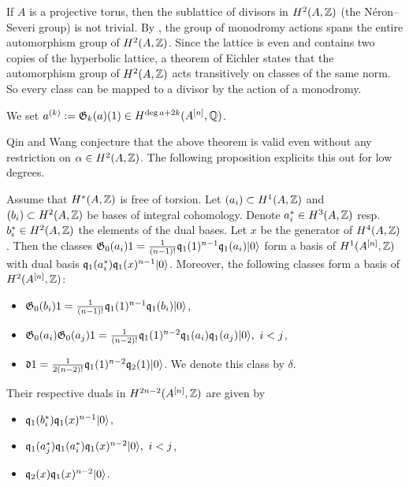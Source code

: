 \begin{remark}
If $A$ is a projective torus, then the sublattice of divisors in $H^2(A,\mathbb{Z})$ (the N\'eron--Severi group) is not trivial. By \cite[Thm.~II]{Shioda}, the group of monodromy actions spans the entire automorphism group of $H^2(A,\mathbb{Z})$.
Since the lattice is even and contains two copies of the hyperbolic lattice, a theorem of Eichler \cite[Prop.~3.7.3]{Scattone} states that the automorphism group of $H^2(A,\mathbb{Z})$ acts transitively on classes of the same norm. So every class can be mapped to a divisor by the action of a monodromy.
\end{remark}

We set $a^{(k)} := \mathfrak{G}_k(a) (1) \in H^{\deg a + 2k}(A^{[n]},\mathbb{Q})$.

\begin{remark}
Qin and Wang \cite{QinWang} conjecture that the above theorem is valid even without any restriction on $\alpha \in H^2(A,\mathbb{Z})$. The following proposition explicits this out for low degrees.
\end{remark}
\begin{proposition} Assume that $H^*(A,\mathbb{Z})$ is free of torsion.
Let $(a_i) \subset H^1(A,\mathbb{Z})$ and $(b_i)\subset H^2(A,\mathbb{Z})$ be bases of integral cohomology. Denote $a_i^*\in H^3(A,\mathbb{Z})$ resp.~$b_i^*\in H^2(A,\mathbb{Z})$ the elements of the dual bases. Let $x$ be the generator of $H^4(A,\mathbb{Z})$. Then the classes
$\mathfrak{G}_0(a_i)1 = \frac{1}{(n-1)!}\mathfrak{q}_{1}(1)^{n-1}\mathfrak{q}_{1}(a_{i})|0\rangle$ form a basis of $H^1(A^{[n]},\mathbb{Z})$ with dual basis
$\mathfrak{q}_1(a_i^*)\mathfrak{q}_1(x)^{n-1}|0\rangle$.
Moreover, the following classes form a basis of $H^2(A^{[n]},\mathbb{Z})$:
\begin{itemize}
 \item $\mathfrak{G}_0(b_i)1=\frac{1}{(n-1)!}\mathfrak{q}_{1}(1)^{n-1}\mathfrak{q}_{1}(b_{i})|0\rangle$,
 \item $\mathfrak{G}_0(a_i)\mathfrak{G}_0(a_j)1 = \frac{1}{(n-2)!}\mathfrak{q}_{1}(1)^{n-2}\mathfrak{q}_{1}(a_{i})\mathfrak{q}_{1}(a_{j})|0\rangle,\  i < j$,
 \item $\mathfrak{d} 1 =  \frac{1}{2(n-2)!}\mathfrak{q}_{1}(1)^{n-2}\mathfrak{q}_{2}(1) |0\rangle$. We denote this class by $\delta$.
\end{itemize}
Their respective duals in $H^{2n-2}(A^{[n]},\mathbb{Z})$ are given by
\begin{itemize}
 \item $\mathfrak{q}_{1}(b_{i}^*)\mathfrak{q}_{1}(x)^{n-1}|0\rangle$,
 \item $\mathfrak{q}_{1}(a_{j}^*)\mathfrak{q}_{1}(a_{i}^*)\mathfrak{q}_{1}(x)^{n-2}|0\rangle,\  i < j$,
 \item $\mathfrak{q}_2(x)\mathfrak{q}_{1}(x)^{n-2} |0\rangle$.
\end{itemize}
\end{proposition}
